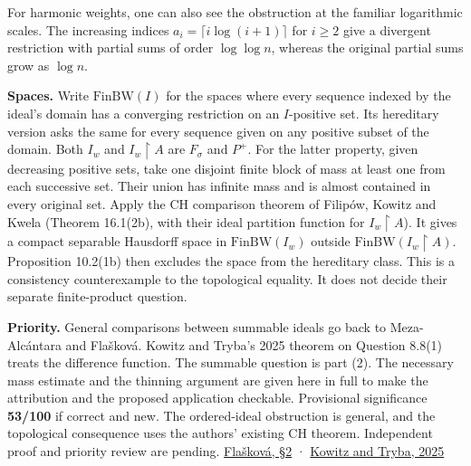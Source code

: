 \documentclass[11pt]{article}
\begin{document}
For harmonic weights, one can also see the obstruction at the familiar logarithmic scales. The increasing indices \(a_i=\lceil i\log(i+1)\rceil\) for \(i\ge2\) give a divergent restriction with partial sums of order \(\log\log n\), whereas the original partial sums grow as \(\log n\).

\textbf{Spaces.} Write \(\mathrm{FinBW}(I)\) for the spaces where every sequence indexed by the ideal's domain has a converging restriction on an \(I\)-positive set. Its hereditary version asks the same for every sequence given on any positive subset of the domain. Both \(I_w\) and \(I_w\restriction A\) are \(F_\sigma\) and \(P^+\). For the latter property, given decreasing positive sets, take one disjoint finite block of mass at least one from each successive set. Their union has infinite mass and is almost contained in every original set. Apply the CH comparison theorem of Filipów, Kowitz and Kwela (Theorem 16.1(2b), with their ideal partition function for \(I_w\restriction A\)). It gives a compact separable Hausdorff space in \(\mathrm{FinBW}(I_w)\) outside \(\mathrm{FinBW}(I_w\restriction A)\). Proposition 10.2(1b) then excludes the space from the hereditary class. This is a consistency counterexample to the topological equality. It does not decide their separate finite-product question.

\textbf{Priority.} General comparisons between summable ideals go back to Meza-Alcántara and Flašková. Kowitz and Tryba's 2025 theorem on Question 8.8(1) treats the difference function. The summable question is part (2). The necessary mass estimate and the thinning argument are given here in full to make the attribution and the proposed application checkable. Provisional significance \textbf{53/100} if correct and new. The ordered-ideal obstruction is general, and the topological consequence uses the authors' existing CH theorem. Independent proof and priority review are pending. \href{https://home.zcu.cz/~blobner/research/IgnotRapid-2012.pdf}{Flašková, §2} · \href{https://doi.org/10.1007/s00153-025-00994-1}{Kowitz and Tryba, 2025}
\end{document}
